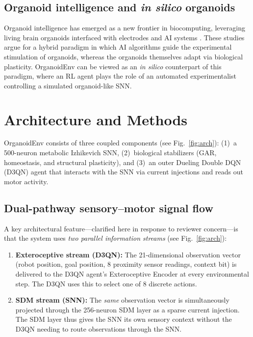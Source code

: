 \documentclass[journal,twocolumn]{IEEEtran}
\begin{document}
\subsection{Organoid intelligence and \emph{in silico} organoids}

Organoid intelligence has emerged as a new frontier in biocomputing,
leveraging living brain organoids interfaced with electrodes and AI
systems \cite{Smirnova2023OI,Hartung2023OIworkshop,Xiong2024BridgingAI}.
These studies argue for a hybrid paradigm in which AI algorithms guide
the experimental stimulation of organoids, whereas the organoids
themselves adapt via biological plasticity.  OrganoidEnv can be viewed
as an \emph{in silico} counterpart of this paradigm, where an RL agent
plays the role of an automated experimentalist controlling a simulated
organoid-like SNN.

\section{Architecture and Methods}

OrganoidEnv consists of three coupled components (see
Fig.~\ref{fig:arch}): (1)~a 500-neuron metabolic Izhikevich SNN,
(2)~biological stabilizers (GAR, homeostasis, and structural
plasticity), and (3)~an outer Dueling Double DQN (D3QN) agent that
interacts with the SNN via current injections and reads out motor
activity.

\subsection{Dual-pathway sensory--motor signal flow}
\label{sec:signalflow}

A key architectural feature---clarified here in response to reviewer
concern---is that the system uses \emph{two parallel information
streams} (see Fig.~\ref{fig:arch}):

\begin{enumerate}
\item \textbf{Exteroceptive stream (D3QN):} The 21-dimensional
      observation vector (robot position, goal position, 8 proximity
      sensor readings, context bit) is delivered to the D3QN agent's
      Exteroceptive Encoder at every environmental step.  The D3QN
      uses this to select one of 8 discrete actions.
\item \textbf{SDM stream (SNN):} The \emph{same} observation vector
      is simultaneously projected through the 256-neuron SDM layer as
      a sparse current injection.  The SDM layer thus gives the SNN
      its own sensory context without the D3QN needing to route
      observations through the SNN.
\end{enumerate}
\end{document}
